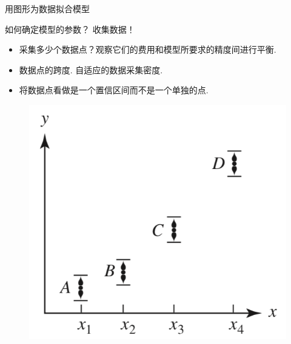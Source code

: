 \documentclass[UTF8]{ctexbeamer}
\begin{document}
\begin{frame}{用图形为数据拟合模型}

  如何确定模型的参数？ 收集数据！

  \begin{itemize}
  \item 采集多少个数据点？观察它们的费用和模型所要求的精度间进行平衡.
  \item 数据点的跨度. 自适应的数据采集密度.
  \item 将数据点看做是一个置信区间而不是一个单独的点.
  \end{itemize}
  
  \begin{figure}
    \centering
    \includegraphics[height=.4\textheight{}]{confid.png}
  \end{figure}
  
\end{frame}
\end{document}
